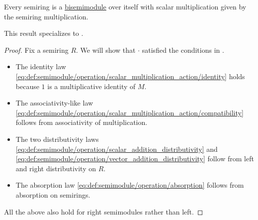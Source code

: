 \begin{proposition}\label{thm:semiring_is_semimodule}
  Every semiring is a \hyperref[def:semimodule/bisemimodule]{bisemimodule} over itself with scalar multiplication given by the semiring multiplication.

  This result specializes to .
\end{proposition}
\begin{proof}
  Fix a semiring \( R \). We will show that \( \cdot \) satisfied the conditions in .
  \begin{itemize}
    \item The identity law \eqref{eq:def:semimodule/operation/scalar_multiplication_action/identity} holds because \( 1 \) is a multiplicative identity of \( M \).
    \item The associativity-like law \eqref{eq:def:semimodule/operation/scalar_multiplication_action/compatibility} follows from associativity of multiplication.
    \item The two distributivity laws \eqref{eq:def:semimodule/operation/scalar_addition_distributivity} and \eqref{eq:def:semimodule/operation/vector_addition_distributivity} follow from left and right distributivity on \( R \).
    \item The absorption law \eqref{eq:def:semimodule/operation/absorption} follows from absorption on semirings.
  \end{itemize}

  All the above also hold for right semimodules rather than left.
\end{proof}

